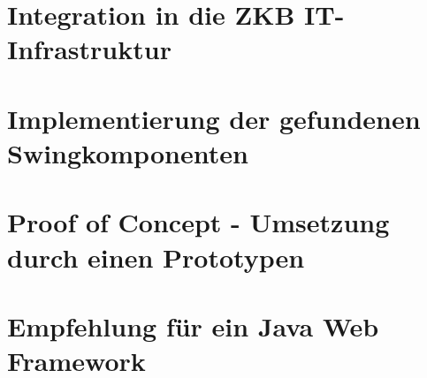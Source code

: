 \documentclass[
11pt, %
a4paper, %
BCOR15mm, %
DIV14, %
footsepline = false, %
headsepline, %
oneside,
openright,
halfparskip, %
abstracton, %
listof=totocnumbered, %
bibliography=totocnumbered %
]{scrreprt}
\begin{document}
   
  
  \cleardoublepage
  
   
  \chapter{Integration in die ZKB
  IT-Infrastruktur}\label{chapter:IntegrationInDieZkbInfrastrukutr}
  
  

  \cleardoublepage

   
  \chapter{Implementierung der gefundenen
  Swingkomponenten}\label{chapter:ImplementierungDerGefundenenSwingkomponenten}
  
  

  \cleardoublepage
  
  
  \chapter{Proof of Concept - Umsetzung durch einen
  Prototypen}\label{chapter:ProofOfConcept}
  
  

  \cleardoublepage  
  
   
  \chapter{Empfehlung für ein Java Web
  Framework}\label{chapter:EmpfehlungFuerEinJavaWebFramework}
  
\end{document}
